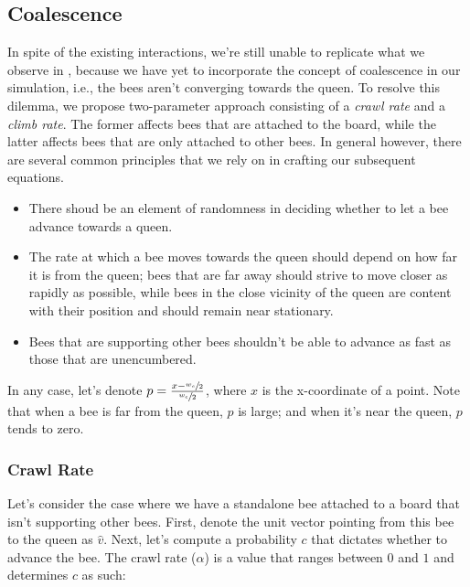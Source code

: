 \documentclass[a4paper,10pt]{article}
\begin{document}
\begin{multicols}{2}
    \subsection{Coalescence}

    In spite of the existing interactions, we're still unable to replicate what we observe
    in \cite{peleg2018collective}, because we have yet to incorporate the concept of coalescence
    in our simulation, i.e., the bees aren't converging towards the queen. To resolve
    this dilemma, we propose two-parameter approach consisting of a \textit{crawl rate}
    and a \textit{climb rate}. The former affects bees that are attached to the board,
    while the latter affects bees that are only attached to other bees. In general however,
    there are several common principles that we rely on in crafting our subsequent equations.

    \begin{itemize}
        \item There shoud be an element of randomness in deciding whether to let a bee advance
        towards a queen.
        \item The rate at which a bee moves towards the queen should depend on how far it
        is from the queen; bees that are far away should strive to move closer as rapidly
        as possible, while bees in the close vicinity of the queen are content with their
        position and should remain near stationary.
        \item Bees that are supporting other bees shouldn't be able to advance as fast as
        those that are unencumbered.
    \end{itemize}

    In any case, let's denote $p = \frac{x - \sfrac{w_{c}}{2}}{\sfrac{w_{c}}{2}}$, where
    $x$ is the x-coordinate of a point. Note that when a bee is far from the queen, $p$ is
    large; and when it's near the queen, $p$ tends to zero.

    \subsubsection{Crawl Rate}

    Let's consider the case where we have a standalone bee attached to a board that isn't
    supporting other bees. First, denote the unit vector pointing from this bee to the queen
    as $\hat v$. Next, let's compute a probability $c$ that dictates whether to advance the bee.
    The crawl rate ($\alpha$) is a value that ranges between $0$ and $1$ and determines $c$
    as such:


\end{multicols}
\end{document}
